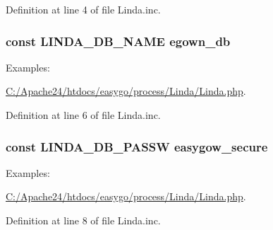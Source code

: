 Definition at line 4 of file Linda.\+inc.

\hypertarget{_linda_8inc_a4e480c562d1f6701e89f603607ddbb54}{}
\subsubsection[{L\+I\+N\+D\+A\+\_\+\+D\+B\+\_\+\+N\+A\+M\+E}]{\setlength{\rightskip}{0pt plus 5cm}const L\+I\+N\+D\+A\+\_\+\+D\+B\+\_\+\+N\+A\+M\+E \textquotesingle{}egown\+\_\+db\textquotesingle{}}\label{_linda_8inc_a4e480c562d1f6701e89f603607ddbb54}
\begin{Desc}
\item[Examples\+: ]\par
\hyperlink{_c_1_2_apache24_2htdocs_2easygo_2process_2_linda_2_linda_8php-example}{C\+:/\+Apache24/htdocs/easygo/process/\+Linda/\+Linda.\+php}.\end{Desc}


Definition at line 6 of file Linda.\+inc.

\hypertarget{_linda_8inc_aef9b254dff90502b875151a93b462df1}{}
\subsubsection[{L\+I\+N\+D\+A\+\_\+\+D\+B\+\_\+\+P\+A\+S\+S\+W}]{\setlength{\rightskip}{0pt plus 5cm}const L\+I\+N\+D\+A\+\_\+\+D\+B\+\_\+\+P\+A\+S\+S\+W \textquotesingle{}easygow\+\_\+secure\textquotesingle{}}\label{_linda_8inc_aef9b254dff90502b875151a93b462df1}
\begin{Desc}
\item[Examples\+: ]\par
\hyperlink{_c_1_2_apache24_2htdocs_2easygo_2process_2_linda_2_linda_8php-example}{C\+:/\+Apache24/htdocs/easygo/process/\+Linda/\+Linda.\+php}.\end{Desc}


Definition at line 8 of file Linda.\+inc.

\hypertarget{_linda_8inc_a75c0048bcb27b8bf9d4e9fd1b9eb023b}{}
